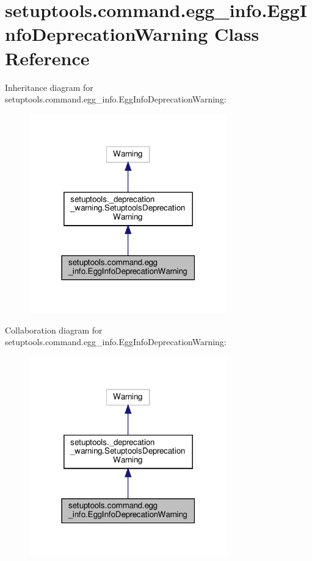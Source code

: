 \hypertarget{classsetuptools_1_1command_1_1egg__info_1_1EggInfoDeprecationWarning}{}\section{setuptools.\+command.\+egg\+\_\+info.\+Egg\+Info\+Deprecation\+Warning Class Reference}
\label{classsetuptools_1_1command_1_1egg__info_1_1EggInfoDeprecationWarning}


Inheritance diagram for setuptools.\+command.\+egg\+\_\+info.\+Egg\+Info\+Deprecation\+Warning\+:
\nopagebreak
\begin{figure}[H]
\begin{center}
\leavevmode
\includegraphics[width=243pt]{classsetuptools_1_1command_1_1egg__info_1_1EggInfoDeprecationWarning__inherit__graph}
\end{center}
\end{figure}


Collaboration diagram for setuptools.\+command.\+egg\+\_\+info.\+Egg\+Info\+Deprecation\+Warning\+:
\nopagebreak
\begin{figure}[H]
\begin{center}
\leavevmode
\includegraphics[width=243pt]{classsetuptools_1_1command_1_1egg__info_1_1EggInfoDeprecationWarning__coll__graph}
\end{center}
\end{figure}


